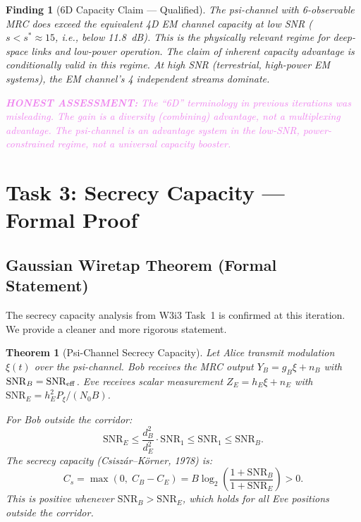 \documentclass[aps,prd,twocolumn,superscriptaddress,nofootinbib]{revtex4-2}
\newcommand{\SNR}{\mathrm{SNR}}
\newcommand{\honest}[1]{\textcolor{violet}{\textbf{HONEST ASSESSMENT:} #1}}
\newtheorem{theorem}{Theorem}
\newtheorem{finding}{Finding}
\begin{document}
\begin{finding}[6D Capacity Claim --- Qualified]
\label{find:6D-qualified}
The psi-channel with 6-observable MRC does exceed the equivalent 4D EM
channel capacity at low SNR ($s < s^* \approx 15$, i.e., below 11.8~dB).
This is the physically relevant regime for deep-space links and low-power
operation. The claim of inherent capacity advantage is \emph{conditionally
valid} in this regime. At high SNR (terrestrial, high-power EM systems),
the EM channel's 4 independent streams dominate.

\honest{The ``6D'' terminology in previous iterations was misleading.
The gain is a diversity (combining) advantage, not a multiplexing advantage.
The psi-channel is an advantage system in the low-SNR, power-constrained
regime, not a universal capacity booster.}
\end{finding}

\section{Task 3: Secrecy Capacity --- Formal Proof}
\label{sec:secrecy}

\subsection{Gaussian Wiretap Theorem (Formal Statement)}

The secrecy capacity analysis from W3i3 Task~1 is confirmed at this iteration.
We provide a cleaner and more rigorous statement.

\begin{theorem}[Psi-Channel Secrecy Capacity]
\label{thm:secrecy}
Let Alice transmit modulation $\xi(t)$ over the psi-channel. Bob receives
the MRC output $Y_B = g_B \xi + n_B$ with $\SNR_B = \SNR_{\rm eff}$.
Eve receives scalar measurement $Z_E = h_E \xi + n_E$ with
$\SNR_E = h_E^2 P_\xi/(N_0 B)$.

For Bob outside the corridor:
\begin{equation}
\SNR_E \leq \frac{d_B^2}{d_E^2} \cdot \SNR_1 \leq \SNR_1 \leq \SNR_B.
\end{equation}
The secrecy capacity (Csisz\'{a}r--K\"{o}rner, 1978) is:
\begin{equation}
\boxed{
C_s = \max\!\left(0,\; C_B - C_E\right)
= B\log_2\!\left(\frac{1 + \SNR_B}{1 + \SNR_E}\right) > 0.
}
\label{eq:Cs}
\end{equation}
This is positive whenever $\SNR_B > \SNR_E$, which holds for all Eve
positions outside the corridor.
\end{theorem}
\end{document}
